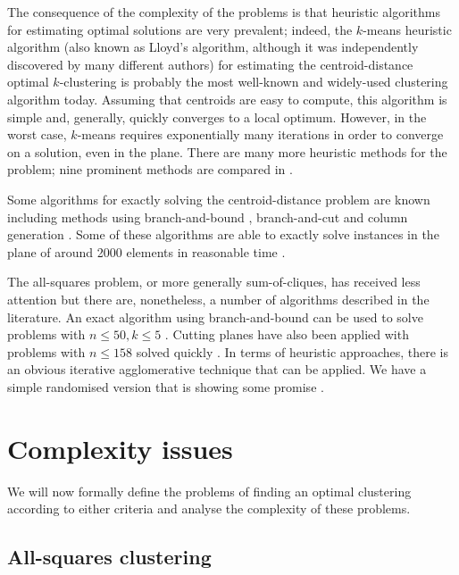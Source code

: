 The consequence of the complexity of the problems is that heuristic algorithms
for estimating optimal solutions are very prevalent; indeed, the $k$-means
heuristic algorithm (also known as Lloyd's algorithm, although it was
independently discovered by many different authors\citep{jain2010data}) for
estimating the centroid-distance optimal $k$-clustering is probably the most
well-known and widely-used clustering algorithm today.  Assuming that
centroids are easy to compute, this algorithm is simple and, generally,
quickly converges to a local optimum.  However, in the worst case, $k$-means
requires exponentially many iterations in order to converge on a solution,
even in the plane\citep{vattani2009exponential}.  There are many more
heuristic methods for the problem; nine prominent methods are compared in
\citep{brusco2007comparison}.

Some algorithms for exactly solving the centroid-distance problem are known
including methods using branch-and-bound \citep{brusco2006repetitive},
branch-and-cut \citep{aloise09exact} and column generation
\citep{merle1999interior}.  Some of these algorithms are able to exactly solve
instances in the plane of around 2000 elements in reasonable time
\citep{aloise09exact}.

The all-squares problem, or more generally sum-of-cliques, has received less
attention but there are, nonetheless, a number of algorithms described in the
literature.  An exact algorithm using branch-and-bound
\citep{klein1991optimal} can be used to solve problems with $n \leq 50, k \leq
5$ \citep{hansen1997mathprog}.  Cutting planes have also been applied with
problems with $n \leq 158$ solved quickly
\citep{hansen1997mathprog,palubeckis1997branch}.  In terms of heuristic
approaches, there is an obvious iterative agglomerative technique that can be
applied.  We have a simple randomised version that is showing some promise
\citep{gk2012agglomerative}.

\section{Complexity issues}
\label{sec:complexity-issues}

We will now formally define the problems of finding an optimal clustering
according to either criteria and analyse the complexity of these problems.

\subsection{All-squares clustering}
\label{sec:all-squar-clust}


